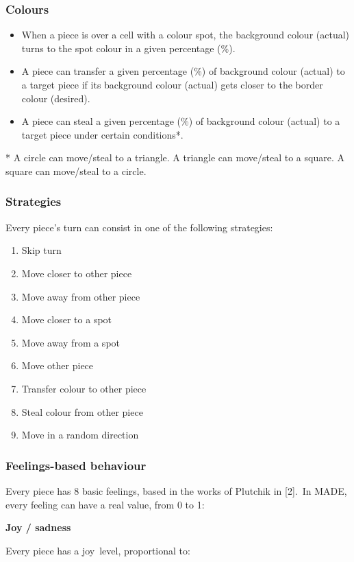 \documentclass[a4paper]{article}
\newcommand\textstyleStrongEmphasis[1]{\textbf{#1}}
\newcommand\liststyleLxiii{%
\renewcommand\labelitemi{{\textbullet}}
\renewcommand\labelitemii{{\textbullet}}
\renewcommand\labelitemiii{{\textbullet}}
\renewcommand\labelitemiv{{\textbullet}}
}
\newcommand\liststyleLxiv{%
\renewcommand\theenumi{\arabic{enumi}}
\renewcommand\theenumii{\arabic{enumii}}
\renewcommand\theenumiii{\arabic{enumiii}}
\renewcommand\theenumiv{\arabic{enumiv}}
\renewcommand\labelenumi{\theenumi.}
\renewcommand\labelenumii{\theenumii.}
\renewcommand\labelenumiii{\theenumiii.}
\renewcommand\labelenumiv{\theenumiv.}
}
\begin{document}
\subsubsection{Colours}
\liststyleLxiii
\begin{itemize}
\item When a piece is over a cell with a colour spot, the background
colour (actual) turns to the spot colour in a given percentage (\%). 
\item A piece can transfer a given percentage (\%) of background colour
(actual) to a target piece if its background colour (actual) gets
closer to the border colour (desired). 
\item A piece can steal a given percentage (\%) of background colour
(actual) to a target piece under certain conditions*. 
\end{itemize}
* A circle can move/steal to a triangle. A triangle can move/steal to a
square. A square can move/steal to a circle.

\subsubsection{Strategies}
Every piece{\textquoteright}s turn can consist in one of the following
strategies:

\liststyleLxiv
\begin{enumerate}
\item Skip turn 
\item Move closer to other piece 
\item Move away from other piece 
\item Move closer to a spot 
\item Move away from a spot 
\item Move other piece 
\item Transfer colour to other piece 
\item Steal colour from other piece 
\item Move in a random direction 
\end{enumerate}
\subsubsection{Feelings-based behaviour}
Every piece has 8 basic feelings, based in the works of Plutchik in
[2].~In MADE, every feeling can have a real value, from 0 to 1:

\textstyleStrongEmphasis{Joy / sadness}

Every piece has a joy~level, proportional to:
\end{document}
